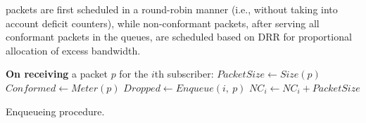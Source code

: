 \documentclass[conference,twoside,final]{IEEEtran}
\begin{document}
packets are first scheduled in a round-robin manner (i.e., without taking into
account deficit counters), while non-conformant packets, after serving all
conformant packets in the queues, are scheduled based on DRR for proportional
allocation of excess bandwidth.
\SetStartEndCondition{ }{}{}\AlgoDontDisplayBlockMarkers\SetAlgoNoEnd\SetAlgoNoLine \DontPrintSemicolon {}\SetAlFnt{\small}\begin{algorithm}[!t]
  \textbf{On receiving} a packet $p$ for the $i$th subscriber:\;
  $PacketSize \leftarrow Size(p)$
  $Conformed \leftarrow Meter(p)$\;
  $Dropped \leftarrow Enqueue(i,~p)$\;
  {
    {
      $NC_{i} \leftarrow NC_{i} + PacketSize$\;
    }
  }
  \caption{Enqueueing procedure.}
  \label{alg:enqueueing}
\end{algorithm}
\end{document}
